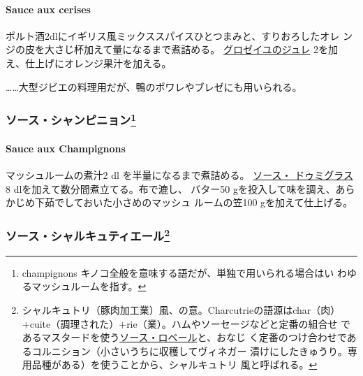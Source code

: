 \hypertarget{sauce-aux-cerises}{%
\paragraph{Sauce aux cerises}\label{sauce-aux-cerises}}


ポルト酒2dlにイギリス風ミックススパイスひとつまみと、すりおろしたオレ
ンジの皮を大さじ\undemi{}杯加えて\deuxtiers{}量になるまで煮詰める。
\href{}{グロゼイユのジュレ}
2\undemi{}を加え、仕上げにオレンジ果汁を加える。

\ldots{}\ldots{}大型ジビエの料理用だが、鴨のポワレやブレゼにも用いられる。

\maeaki

\hypertarget{ux30bdux30fcux30b9ux30b7ux30e3ux30f3ux30d4ux30cbux30e7ux30f37}{%
\subsubsection[ソース・シャンピニョン]{\texorpdfstring{ソース・シャンピニョン\footnote{champignons
  キノコ全般を意味する語だが、単独で用いられる場合はい
  わゆるマッシュルームを指す。}}{ソース・シャンピニョン}}\label{ux30bdux30fcux30b9ux30b7ux30e3ux30f3ux30d4ux30cbux30e7ux30f37}}

\hypertarget{sauce-aux-champignons}{%
\paragraph{Sauce aux Champignons}\label{sauce-aux-champignons}}


マッシュルームの煮汁2\undemi{} dl を半量になるまで煮詰める。
\protect\hyperlink{sauce-demi-glace}{ソース・ ドゥミグラス}8
dlを加えて数分間煮立てる。布で漉し、 バター50
gを投入して味を調え、あらかじめ下茹でしておいた小さめのマッシュ
ルームの笠100 gを加えて仕上げる。

\maeaki

\hypertarget{ux30bdux30fcux30b9ux30b7ux30e3ux30ebux30adux30e5ux30c6ux30a3ux30a8ux30fcux30eb8}{%
\subsubsection[ソース・シャルキュティエール]{\texorpdfstring{ソース・シャルキュティエール\footnote{シャルキュトリ（豚肉加工業）風、の意。Charcutrieの語源はchar（肉）
  +cuite（調理された）+rie（業）。ハムやソーセージなどと定番の組合せ
  であるマスタードを使う\protect\hyperlink{sauce-robert}{ソース・ロベール}と、おなじ
  く定番のつけ合わせであるコルニション（小さいうちに収穫してヴィネガー
  漬けにしたきゅうり。専用品種がある）を使うことから、シャルキュトリ
  風と呼ばれる。}}{ソース・シャルキュティエール}}\label{ux30bdux30fcux30b9ux30b7ux30e3ux30ebux30adux30e5ux30c6ux30a3ux30a8ux30fcux30eb8}}

